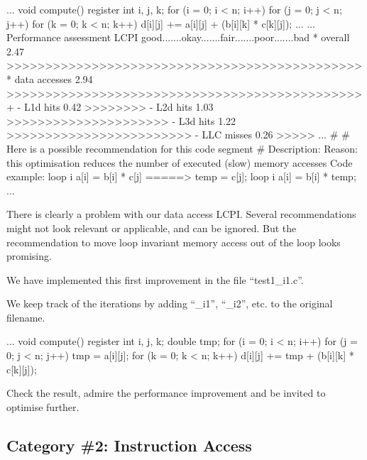 \begin{prompt}
...
void compute()
{
register int i, j, k;
for (i = 0; i < n; i++)
  for (j = 0; j < n; j++)
    for (k = 0; k < n; k++)
      d[i][j] += a[i][j] + (b[i][k] * c[k][j]);
}
...
...
Performance assessment  LCPI good.......okay.......fair.......poor.......bad
* overall              2.47 >>>>>>>>>>>>>>>>>>>>>>>>>>>>>>>>>>>>>>>>>>>>>>
* data accesses        2.94 >>>>>>>>>>>>>>>>>>>>>>>>>>>>>>>>>>>>>>>>>>>>>>+
- L1d hits             0.42 >>>>>>>>
- L2d hits             1.03 >>>>>>>>>>>>>>>>>>>>>
- L3d hits             1.22 >>>>>>>>>>>>>>>>>>>>>>>>
- LLC misses           0.26 >>>>>
...
\#
\# Here is a possible recommendation for this code segment
\#
Description: %
Reason: this optimisation reduces the number of executed (slow) memory accesses
Code example:
loop i {
  a[i] = b[i] * c[j]
}
=====>
temp = c[j];
loop i {
 a[i] = b[i] * temp;
}
...
\end{prompt}

There is clearly a problem with our data access LCPI. Several recommendations might not look relevant or applicable, and can be ignored. But the recommendation to move loop invariant memory access out of the loop looks promising.

We have implemented this first improvement in the file ``test1\_i1.c''.

 We keep track of the iterations by adding ``\_i1'', ``\_i2'', etc. to the original filename.

\begin{prompt}
...
void compute()
{
register int i, j, k;
double tmp;
for (i = 0; i < n; i++)
  for (j = 0; j < n; j++)
  {
    tmp = a[i][j];
    for (k = 0; k < n; k++)
      d[i][j] += tmp + (b[i][k] * c[k][j]);
  }
}
\end{prompt}

Check the result, admire the performance improvement and be invited to optimise further.

\subsection{Category \#2: Instruction Access}
\label{subsec:CAT2_Instruction_Access}

